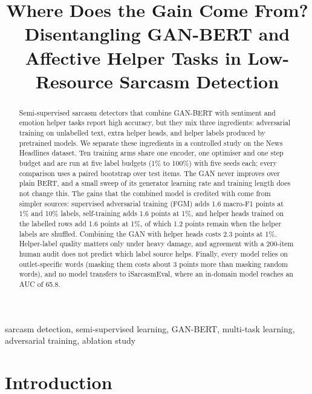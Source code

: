 \documentclass[conference]{IEEEtran}
\begin{document}
\title{Where Does the Gain Come From? Disentangling GAN-BERT and Affective Helper Tasks in Low-Resource Sarcasm Detection}

\author{
}

\maketitle

\begin{abstract}
Semi-supervised sarcasm detectors that combine GAN-BERT with sentiment and emotion helper tasks report high accuracy, but they mix three ingredients: adversarial training on unlabelled text, extra helper heads, and helper labels produced by pretrained models. We separate these ingredients in a controlled study on the News Headlines dataset. Ten training arms share one encoder, one optimiser and one step budget and are run at five label budgets (1\% to 100\%) with five seeds each; every comparison uses a paired bootstrap over test items. The GAN never improves over plain BERT, and a small sweep of its generator learning rate and training length does not change this. The gains that the combined model is credited with come from simpler sources: supervised adversarial training (FGM) adds 1.6 macro-F1 points at 1\% and 10\% labels, self-training adds 1.6 points at 1\%, and helper heads trained on the labelled rows add 1.6 points at 1\%, of which 1.2 points remain when the helper labels are shuffled. Combining the GAN with helper heads costs 2.3 points at 1\%. Helper-label quality matters only under heavy damage, and agreement with a 200-item human audit does not predict which label source helps. Finally, every model relies on outlet-specific words (masking them costs about 3 points more than masking random words), and no model transfers to iSarcasmEval, where an in-domain model reaches an AUC of 65.8.
\end{abstract}

\begin{IEEEkeywords}
sarcasm detection, semi-supervised learning, GAN-BERT, multi-task learning, adversarial training, ablation study
\end{IEEEkeywords}

\section{Introduction}
\end{document}
